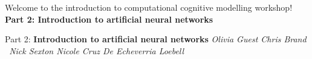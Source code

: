 \documentclass{beamer}
\begin{document}
\begin{frame}
% 
\centering\Huge Welcome to the introduction to computational cognitive modelling workshop! 
\vfill \huge
\centering\textbf{Part 2: Introduction to artificial neural networks} \normalsize
\vfill
\end{frame}

\begin{frame}
% 
\vfill \Huge
\centering Part 2: \textbf{Introduction to artificial neural networks} \large
\vfill
\textit{
Olivia Guest \hfill  Chris Brand 
\vspace{0.5cm} \\ \ 
Nick Sexton \hfill Nicole Cruz De Echeverria Loebell } 
\end{frame}
\end{document}
